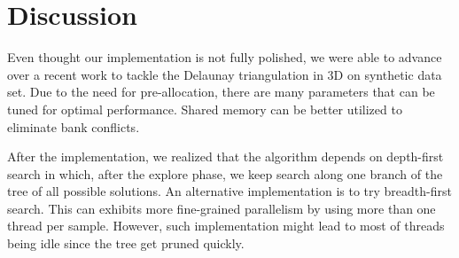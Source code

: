 \documentclass[12pt] {article}
\begin{document}
\section*{Discussion}
Even thought our implementation is not fully polished, we were able to advance over a recent work to tackle the Delaunay triangulation in 3D on synthetic data set. Due to the need for pre-allocation, there are many parameters that can be tuned for optimal performance. Shared memory can be better utilized to eliminate bank conflicts. 

After the implementation, we realized that the algorithm depends on depth-first search in which, after the explore phase, we keep search along one branch of the tree of all possible solutions. An alternative implementation is to try breadth-first search. This can exhibits more fine-grained parallelism by using more than one thread per sample. However, such implementation might lead to most of threads being idle since the tree get pruned quickly. 



\end{document}
